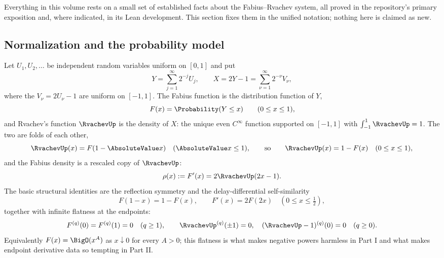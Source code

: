 \documentclass[11pt,oneside]{article}
\numberwithin{equation}{section}
\theoremstyle{definition}
\theoremstyle{remark}
\begin{document}
Everything in this volume rests on a small set of established facts
about the Fabius--Rvachev system, all proved in the repository's primary
exposition \cite{ProveItPrimary} and, where indicated, in its Lean
development.  This section fixes them in the unified notation; nothing
here is claimed as new.

\subsection{Normalization and the probability model}
\label{sec:normalization}

Let $U_1,U_2,\ldots$ be independent random variables uniform on
$[0,1]$ and put
\begin{equation}
 Y=\sum_{j=1}^{\infty}2^{-j}U_j,
 \qquad
 X=2Y-1=\sum_{\nu=1}^{\infty}2^{-\nu}V_\nu,
 \label{eq:Y-law}
\end{equation}
where the $V_\nu=2U_\nu-1$ are uniform on $[-1,1]$.  The Fabius
function is the distribution function of $Y$,
\begin{equation}
 F(x)=\Probability(Y\le x)\qquad(0\le x\le1),
 \label{eq:F-def}
\end{equation}
and Rvachev's function $\RvachevUp$ is the density of $X$: the unique even
$C^\infty$ function supported on $[-1,1]$ with
$\int_{-1}^1\RvachevUp=1$.  The two are folds of each other,
\begin{equation}
 \RvachevUp(x)=F(1-\AbsoluteValue x)\quad(\AbsoluteValue x\le1),
 \qquad\text{so}\qquad
 \RvachevUp(x)=1-F(x)\quad(0\le x\le1),
 \label{eq:up-fold}
\end{equation}
and the Fabius density is a rescaled copy of $\RvachevUp$:
\begin{equation}
 \rho(x):=F'(x)=2\RvachevUp(2x-1).
 \label{eq:fabius-density}
\end{equation}
The basic structural identities are the reflection symmetry and the
delay-differential self-similarity
\begin{equation}
 F(1-x)=1-F(x),
 \qquad
 F'(x)=2F(2x)\quad(0\le x\le\tfrac12),
 \label{eq:F-symmetry}
\end{equation}
together with infinite flatness at the endpoints:
\begin{equation}
 F^{(q)}(0)=F^{(q)}(1)=0
 \quad(q\ge1),
 \qquad
 \RvachevUp^{(q)}(\pm1)=0,\quad
 (\RvachevUp-1)^{(q)}(0)=0\quad(q\ge0).
 \label{eq:flatness}
\end{equation}
Equivalently $F(x)=\BigO(x^A)$ as $x\downarrow0$ for every $A>0$; this
flatness is what makes negative powers harmless in Part I and what makes
endpoint derivative data so tempting in Part II.
\end{document}

